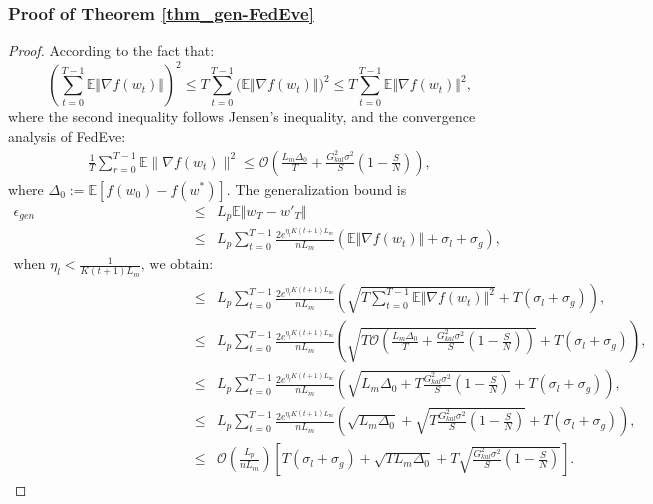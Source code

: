 \subsubsection{Proof of Theorem \ref{thm_gen-FedEve}}
\begin{proof}
    According to the fact that:
\begin{equation}    \label{eq_Jensen}
    \left(\sum_{t=0}^{T-1}  \mathbb{E}\Vert \nabla f(w_t) \Vert \right)^2 \le T \sum_{t=0}^{T-1}  \big(\mathbb{E}\Vert \nabla f(w_t) \Vert\big)^2 \le T \sum_{t=0}^{T-1}  \mathbb{E}\Vert \nabla f(w_t) \Vert^2, \nonumber
\end{equation}
where the second inequality follows Jensen's inequality, and the convergence analysis of FedEve:
    \begin{eqnarray}    
        \frac{1}{T}\sum_{r=0}^{T-1}\mathbb{E}\|\nabla f(w_t)\|^2
        \leq \mathcal{O}\left(\frac{L_m\Delta_0}{T} + \frac{G_{kal}^2 \sigma^2}{S} \left(1 - \frac{S}{N}\right)\right), \nonumber
    \end{eqnarray}
where $\Delta_0 := \mathbb{E}[f(w_0) - f(w^*)]$. The generalization bound is
\begin{eqnarray}   
    \epsilon_{gen} 
    &\le&  L_p \mathbb{E}\Vert w_T - w'_T \Vert \nonumber\\
    &\le&  L_p \sum_{t=0}^{T-1} \frac{2e^{\eta_lK(t+1) L_m}}{n L_m}\left( \mathbb{E}\Vert \nabla f(w_t) \Vert +\sigma_{l} + \sigma_{g} \right),\nonumber\\
    \text{when $\eta_l<\tfrac{1}{K(t+1) L_m}$, we obtain:}\nonumber\\
    &\le& L_p \sum_{t=0}^{T-1} \frac{2e^{\eta_lK(t+1) L_m}}{n L_m} \left( \sqrt{T \sum_{t=0}^{T-1}  \mathbb{E}\Vert \nabla f(w_t) \Vert^2} + T (\sigma_{l} + \sigma_{g}) \right),\nonumber\\
    &\le& L_p \sum_{t=0}^{T-1} \frac{2e^{\eta_lK(t+1) L_m}}{n L_m} \left( \sqrt{T \mathcal{O}\left(\frac{L_m \Delta_0}{T} + \frac{G_{kal}^2 \sigma^2}{S} \left(1 - \frac{S}{N}\right)\right)} + T (\sigma_{l} + \sigma_{g}) \right),\nonumber\\
    &\le& L_p \sum_{t=0}^{T-1} \frac{2e^{\eta_lK(t+1) L_m}}{n L_m} \left( \sqrt{L_m \Delta_0 + T \frac{G_{kal}^2 \sigma^2}{S} \left(1 - \frac{S}{N}\right)} + T (\sigma_{l} + \sigma_{g}) \right),\nonumber\\
    &\le& L_p \sum_{t=0}^{T-1} \frac{2e^{\eta_lK(t+1) L_m}}{n L_m} \left( \sqrt{L_m \Delta_0} + \sqrt{T \frac{G_{kal}^2 \sigma^2}{S} \left(1 - \frac{S}{N}\right)} + T (\sigma_{l} + \sigma_{g}) \right),\nonumber\\
    &\le& \mathcal{O}\left( \frac{L_p}{nL_m} \right) \left[ T (\sigma_{l} + \sigma_{g}) + \sqrt{T L_m \Delta_0} + T \sqrt{\frac{G_{kal}^2 \sigma^2}{S} \left(1 - \frac{S}{N}\right)} \right]. \nonumber
\end{eqnarray}
\end{proof}